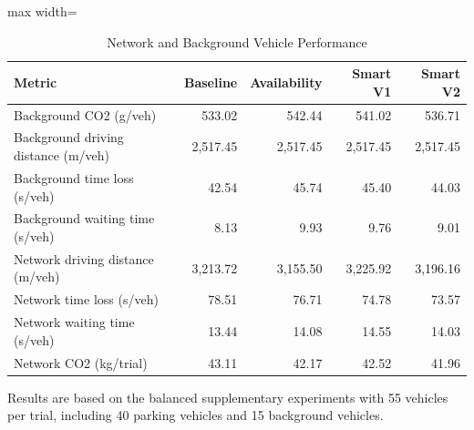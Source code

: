 \begin{table}[t]
\centering
\caption{Network and Background Vehicle Performance}
\label{tab:network_performance}
\small
\setlength{\tabcolsep}{4pt}
\begin{adjustbox}{max width=\textwidth}

\begin{tabular}{lrrrr}
\toprule
Metric & Baseline & Availability & Smart V1 & Smart V2\\
\midrule
Background CO2 (g/veh) & 533.02 & 542.44 & 541.02 & 536.71\\
Background driving distance (m/veh) & 2,517.45 & 2,517.45 & 2,517.45 & 2,517.45\\
Background time loss (s/veh) & 42.54 & 45.74 & 45.40 & 44.03\\
Background waiting time (s/veh) & 8.13 & 9.93 & 9.76 & 9.01\\
Network driving distance (m/veh) & 3,213.72 & 3,155.50 & 3,225.92 & 3,196.16\\
\addlinespace
Network time loss (s/veh) & 78.51 & 76.71 & 74.78 & 73.57\\
Network waiting time (s/veh) & 13.44 & 14.08 & 14.55 & 14.03\\
Network CO2 (kg/trial) & 43.11 & 42.17 & 42.52 & 41.96\\
\bottomrule
\end{tabular}
\end{adjustbox}
\par\smallskip
\begin{minipage}{\textwidth}
\footnotesize
Results are based on the balanced supplementary experiments with 55 vehicles per trial, including 40 parking vehicles and 15 background vehicles.
\end{minipage}
\end{table}
